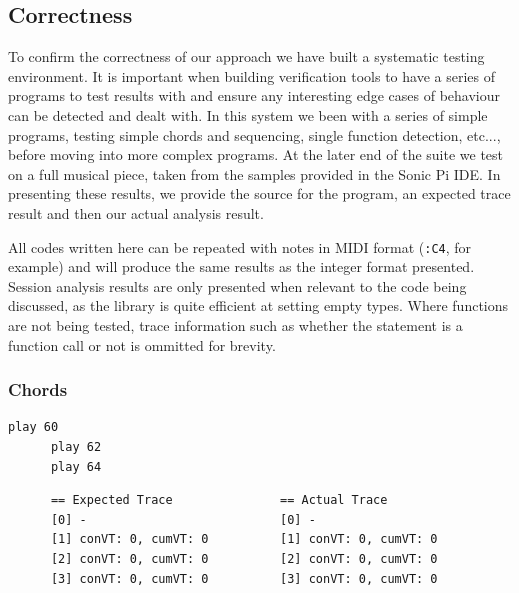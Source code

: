 \documentclass[11pt, abstracton, twoside]{scrartcl}
\begin{document}





\subsection{Correctness}
To confirm the correctness of our approach we have built a systematic testing
environment. It is important when building verification tools to have a series
of programs to test results with and ensure any interesting edge cases of behaviour
can be detected and dealt with. In this system we been with a series of simple
programs, testing simple chords and sequencing, single function detection, etc...,
before moving into more complex programs. At the later end of the suite we test
on a full musical piece, taken from the samples provided in the Sonic Pi IDE. In
presenting these results, we provide the source for the program, an expected trace
result and then our actual analysis result.

All codes written here can be repeated with notes in MIDI format (\texttt{:C4}, 
for example) and will produce the same results as the integer format presented.
Session analysis results are only presented when relevant to the code being
discussed, as the library is quite efficient at setting empty types. Where functions
are not being tested, trace information such as whether the statement is a function 
call or not is ommitted for brevity.

\subsubsection{Chords}

\begin{minipage}{\textwidth}
	\begin{lstlisting}[style = sonicpi]
      play 60
      play 62
      play 64
	\end{lstlisting}
\end{minipage}

\begin{lstlisting}
      == Expected Trace               == Actual Trace
      [0] -                           [0] -
      [1] conVT: 0, cumVT: 0          [1] conVT: 0, cumVT: 0
      [2] conVT: 0, cumVT: 0          [2] conVT: 0, cumVT: 0
      [3] conVT: 0, cumVT: 0          [3] conVT: 0, cumVT: 0
\end{lstlisting}
\end{document}
